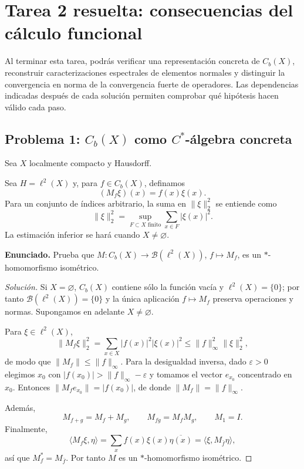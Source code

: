 \chapter{Tarea 2 resuelta: consecuencias del cálculo funcional}

\begin{context}
Al terminar esta tarea, podrás verificar una representación concreta de $C_b(X)$, reconstruir
caracterizaciones espectrales de elementos normales y distinguir la convergencia en norma de la
convergencia fuerte de operadores. Las dependencias indicadas después de cada solución permiten
comprobar qué hipótesis hacen válido cada paso.
\end{context}

\section{Problema 1: $C_b(X)$ como $C^*$-álgebra concreta}

Sea $X$ localmente compacto y Hausdorff.


Sea $H=\ell^2(X)$ y, para $f\in C_b(X)$, definamos
\[
 (M_f\xi)(x)=f(x)\xi(x).
\]
Para un conjunto de índices arbitrario, la suma en $\|\xi\|_2^2$ se entiende como
\[
 \|\xi\|_2^2=\sup_{F\subset X\text{ finito}}\sum_{x\in F}|\xi(x)|^2.
\]
La estimación inferior se hará cuando $X\ne\varnothing$.

\noindent\textbf{Enunciado.} Prueba que $M:C_b(X)\to\mathcal B(\ell^2(X))$, $f\mapsto M_f$, es un $*$-homomorfismo isométrico.

\begin{proof}[Solución]
Si $X=\varnothing$, $C_b(X)$ contiene sólo la función vacía y $\ell^2(X)=\{0\}$; por tanto
$\mathcal B(\ell^2(X))=\{0\}$ y la única aplicación $f\mapsto M_f$ preserva operaciones y
normas. Supongamos en adelante $X\ne\varnothing$.

Para $\xi\in\ell^2(X)$,
\[
\|M_f\xi\|_2^2
=\sum_{x\in X}|f(x)|^2|\xi(x)|^2
\le\|f\|_\infty^2\|\xi\|_2^2,
\]
de modo que $\|M_f\|\le\|f\|_\infty$. Para la desigualdad inversa, dado
$\varepsilon>0$ elegimos $x_0$ con $|f(x_0)|>\|f\|_\infty-\varepsilon$ y tomamos el vector
$e_{x_0}$ concentrado en $x_0$. Entonces
$\|M_fe_{x_0}\|=|f(x_0)|$, de donde $\|M_f\|=\|f\|_\infty$.

Además,
\[
M_{f+g}=M_f+M_g,
\qquad M_{fg}=M_fM_g,
\qquad M_1=I.
\]
Finalmente,
\[
\langle M_f\xi,\eta\rangle
=\sum_x f(x)\xi(x)\overline{\eta(x)}
=\langle \xi,M_{\bar f}\eta\rangle,
\]
así que $M_f^*=M_{\bar f}$. Por tanto $M$ es un $*$-homomorfismo isométrico.
\end{proof}

